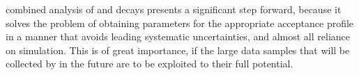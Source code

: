  combined analysis of \BtoDK and \BtoDpi decays presents a significant step forward, because it solves the problem of obtaining \Fi parameters for the appropriate acceptance profile in a manner that avoids leading systematic uncertainties, and almost all reliance on simulation. This is of great importance, if the large data samples that will be collected by \lhcb in the future are to be exploited to their full potential.







